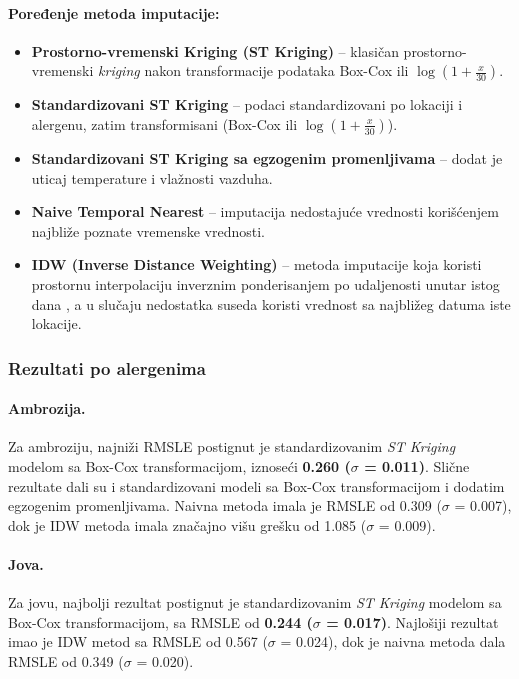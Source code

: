 \documentclass[12pt]{article}
\begin{document}
\vspace{0.3cm}
\noindent \paragraph{\textbf{Poređenje metoda imputacije:}}

\begin{itemize}
    \item \textbf{Prostorno-vremenski Kriging (ST Kriging)} – klasičan prostorno-vremenski \textit{kriging} \cite{cressie1993statistics, chiles2012geostatistics} nakon transformacije podataka Box-Cox ili $\operatorname{log}(1+\frac{x}{30})$.
    \item \textbf{Standardizovani ST Kriging} – podaci standardizovani po lokaciji i alergenu, zatim transformisani (Box-Cox ili $\operatorname{log}(1+\frac{x}{30})$).
    \item \textbf{Standardizovani ST Kriging sa egzogenim promenljivama} – dodat je uticaj temperature i vlažnosti vazduha.
    \item \textbf{Naive Temporal Nearest} – imputacija nedostajuće vrednosti korišćenjem najbliže poznate vremenske vrednosti.
    \item \textbf{IDW (Inverse Distance Weighting)} – metoda imputacije koja koristi prostornu interpolaciju inverznim ponderisanjem po udaljenosti unutar istog dana \cite{shepard1968two}, a u slučaju nedostatka suseda koristi vrednost sa najbližeg datuma iste lokacije.
\end{itemize}


\subsubsection{Rezultati po alergenima}

\paragraph{Ambrozija.}
Za ambroziju, najniži RMSLE postignut je standardizovanim \textit{ST Kriging} modelom sa Box-Cox transformacijom, iznoseći \textbf{0.260 ($\sigma$ = 0.011)}. Slične rezultate dali su i standardizovani modeli sa Box-Cox transformacijom i dodatim egzogenim promenljivama. Naivna metoda imala je RMSLE od 0.309 ($\sigma$ = 0.007), dok je IDW metoda imala značajno višu grešku od 1.085 ($\sigma$ = 0.009).

\paragraph{Jova.}
Za jovu, najbolji rezultat postignut je standardizovanim \textit{ST Kriging} modelom sa Box-Cox transformacijom, sa RMSLE od \textbf{0.244 ($\sigma$ = 0.017)}. Najlošiji rezultat imao je IDW metod sa RMSLE od 0.567 ($\sigma$ = 0.024), dok je naivna metoda dala RMSLE od 0.349 ($\sigma$ = 0.020).
\end{document}
